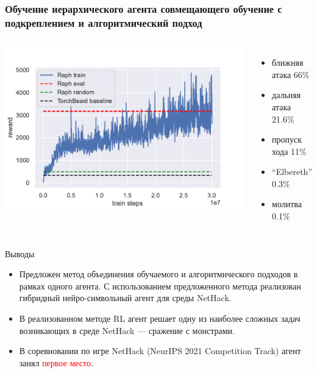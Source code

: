 \begin{frame}
\frametitle{Обучение иерархического агента совмещающего обучение с подкреплением и алгоритмический подход}
\begin{columns}
\centering
\includegraphics[width=1\linewidth]{images/raph_train.pdf}
\begin{itemize}
    \item ближняя атака 66\%
    \item дальняя атака 21.6\%
    \item пропуск хода 11\%
    \item ``Elbereth'' 0.3\%
    \item молитва 0.1\%
\end{itemize}
\end{columns}
\end{frame}


\begin{frame}{Выводы}
\begin{itemize}
    \item Предложен метод объединения обучаемого и алгоритмического подходов в рамках одного агента. С использованием предложенного метода реализован гибридный нейро-символьный агент для среды NetHack.
    \item В реализованном методе RL агент решает одну из наиболее сложных задач возникающих в среде NetHack — сражение с монстрами.
    \item В соревновании по игре NetHack (NeurIPS 2021 Competition Track) агент занял \textcolor{red}{первое место}.
\end{itemize}
    
\end{frame}

